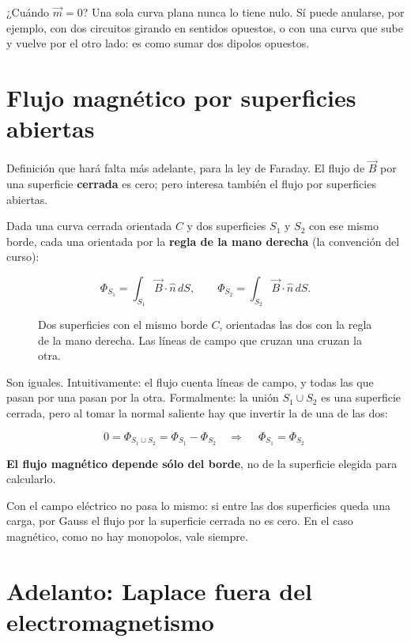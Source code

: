 \documentclass[12pt,a4paper]{article}
\begin{document}
¿Cuándo $\vec m = 0$? Una sola curva plana nunca lo tiene nulo. Sí puede
anularse, por ejemplo, con dos circuitos girando en sentidos opuestos, o con
una curva que sube y vuelve por el otro lado: es como sumar dos dipolos
opuestos.

\section{Flujo magnético por superficies abiertas}

Definición que hará falta más adelante, para la ley de Faraday. El flujo de
$\vec B$ por una superficie \textbf{cerrada} es cero; pero interesa también el flujo
por superficies abiertas.

Dada una curva cerrada orientada $C$ y dos superficies $S_1$ y $S_2$ con ese
mismo borde, cada una orientada por la \textbf{regla de la mano derecha} (la
convención del curso):

\[
\Phi_{S_1} = \int_{S_1}\vec B\cdot\hat n\,dS,
\qquad
\Phi_{S_2} = \int_{S_2}\vec B\cdot\hat n\,dS .
\]

\begin{figure}[H]
  \centering
  
  \caption{Dos superficies con el mismo borde $C$, orientadas las dos con la regla de la mano derecha. Las líneas de campo que cruzan una cruzan la otra.}
\end{figure}

Son iguales. Intuitivamente: el flujo cuenta líneas de campo, y todas las que
pasan por una pasan por la otra. Formalmente: la unión $S_1\cup S_2$ es una
superficie cerrada, pero al tomar la normal saliente hay que invertir la de una
de las dos:

\[
0 = \Phi_{S_1\cup S_2} = \Phi_{S_1} - \Phi_{S_2}
\quad\Longrightarrow\quad
\boxed{\ \Phi_{S_1} = \Phi_{S_2}\ }
\]

\textbf{El flujo magnético depende sólo del borde}, no de la superficie elegida para
calcularlo.

\begin{notebox}
Con el campo eléctrico no pasa lo mismo: si entre las dos superficies queda
una carga, por Gauss el flujo por la superficie cerrada no es cero. En el
caso magnético, como no hay monopolos, vale siempre.
\end{notebox}

\section{Adelanto: Laplace fuera del electromagnetismo}
\end{document}
